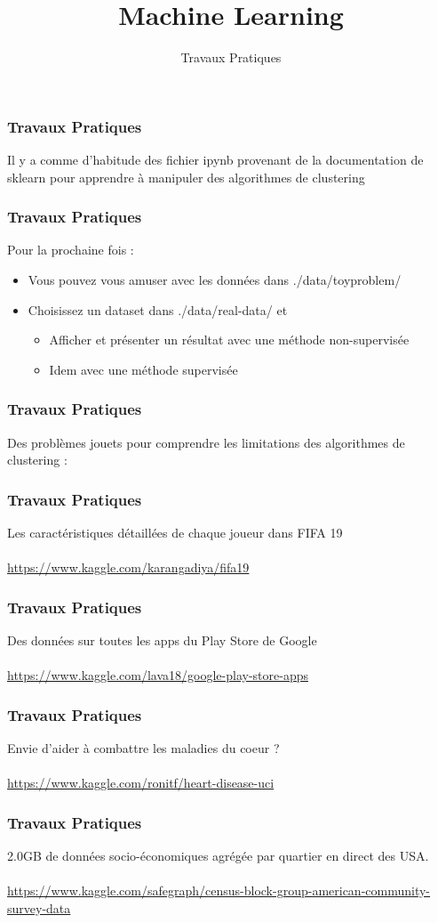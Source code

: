 \documentclass{formation}
\title{Machine Learning}
\subtitle{Travaux Pratiques}
\begin{document}
\maketitle

\begin{frame}
  \frametitle{Travaux Pratiques}
  Il y a comme d'habitude des fichier ipynb provenant de la documentation de sklearn pour apprendre à manipuler des algorithmes de clustering
\end{frame}

\begin{frame}
  \frametitle{Travaux Pratiques}
  Pour la prochaine fois :
  \begin{itemize}
  \item Vous pouvez vous amuser avec les données dans ./data/toyproblem/\*
  \item Choisissez un dataset dans ./data/real-data/\* et
    \begin{itemize}
    \item Afficher et présenter un résultat avec une méthode non-supervisée
    \item Idem avec une méthode supervisée
    \end{itemize}
  \end{itemize}
\end{frame}

\begin{frame}
  \frametitle{Travaux Pratiques}
  Des problèmes jouets pour comprendre les limitations des algorithmes de clustering :
\end{frame}

\begin{frame}
  \frametitle{Travaux Pratiques}
  Les caractéristiques détaillées de chaque joueur dans FIFA 19 \\
  \\
  \url{https://www.kaggle.com/karangadiya/fifa19}
\end{frame}

\begin{frame}
  \frametitle{Travaux Pratiques}
  Des données sur toutes les apps du Play Store de Google \\
  \\
  \url{https://www.kaggle.com/lava18/google-play-store-apps}
\end{frame}

\begin{frame}
  \frametitle{Travaux Pratiques}
  Envie d'aider à combattre les maladies du coeur ? \\
  \\
  \url{https://www.kaggle.com/ronitf/heart-disease-uci}
\end{frame}

\begin{frame}
  \frametitle{Travaux Pratiques}
  2.0GB de données socio-économiques agrégée par quartier en direct des USA. \\
  \\
  \url{https://www.kaggle.com/safegraph/census-block-group-american-community-survey-data}
\end{frame}
\end{document}
